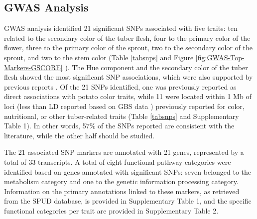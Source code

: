 \documentclass[pdflatex,sn-mathphys-ay]{sn-jnl}%
\begin{document}
\subsection{GWAS  Analysis}


 GWAS analysis identified 21 significant SNPs associated with five traits: ten related to the secondary color of the tuber flesh, four to the primary color of the flower,  three to the primary color of the sprout, two to the secondary color of the sprout, and two to the stem color (Table \ref{tabsnps} and Figure \ref{fig:GWAS-Top-Markers-GSCORE} ). The Hue component and the secondary color of the tuber flesh showed the most significant SNP associations, which were also supported by previous reports \citep{pandey2022genomic,riveros2022uncovering,sharma2024genotyping,parra2019chromosomes}. Of the 21 SNPs identified, one was previously reported as direct associations with potato color traits, while 11 were located within 1 Mb of loci (less than LD reported based on GBS data \citep{sharma2024genotyping,Berdugo2017}) previously reported for color, nutritional, or other tuber-related traits (Table \ref{tabsnps} and  Supplementary Table 1). In other words, 57\% of the SNPs reported are consistent with the literature, while the other half should be studied.   


The 21 associated SNP markers are annotated with 21 genes, represented by a total of 33 transcripts.  A total of eight functional pathway categories were identified based on genes annotated with significant SNPs: seven belonged to the metabolism category and one to the genetic information processing category. Information on the primary annotations linked to these markers, as retrieved from the SPUD database, is provided in Supplementary Table 1, and the specific functional categories per trait are provided in Supplementary Table 2. 


\end{document}
